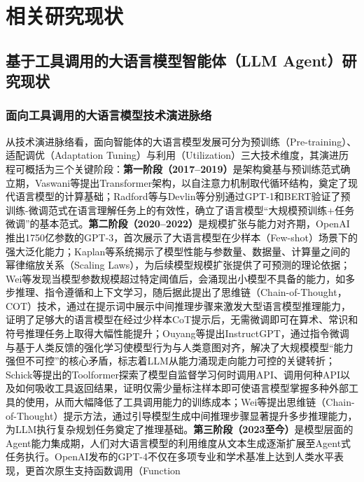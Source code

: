 \section{相关研究现状}

\subsection{基于工具调用的大语言模型智能体（LLM Agent）研究现状}

\subsubsection{面向工具调用的大语言模型技术演进脉络}

从技术演进脉络看，面向智能体的大语言模型发展可分为预训练（Pre-training）、适配调优（Adaptation Tuning）与利用（Utilization）三大技术维度\cite{zhao2023survey}，其演进历程可概括为三个关键阶段：\textbf{第一阶段（2017--2019）}是架构奠基与预训练范式确立期，Vaswani等\cite{vaswani2017attention}提出Transformer架构，以自注意力机制取代循环结构，奠定了现代语言模型的计算基础；Radford等\cite{radford2018improving}与Devlin等\cite{devlin2019bert}分别通过GPT-1和BERT验证了预训练-微调范式在语言理解任务上的有效性，确立了语言模型“大规模预训练+任务微调”的基本范式。\textbf{第二阶段（2020--2022）}是规模扩张与能力对齐期，OpenAI\cite{brown2020language}推出1750亿参数的GPT-3，首次展示了大语言模型在少样本（Few-shot）场景下的强大泛化能力；Kaplan等\cite{kaplan2020scaling}系统揭示了模型性能与参数量、数据量、计算量之间的幂律缩放关系（Scaling Laws），为后续模型规模扩张提供了可预测的理论依据；Wei等\cite{wei2022emergent}发现当模型参数规模超过特定阈值后，会涌现出小模型不具备的能力，如多步推理、指令遵循和上下文学习，随后据此提出了思维链（Chain-of-Thought，COT）\cite{wei2022chain}技术，通过在提示词中展示中间推理步骤来激发大型语言模型推理能力，证明了足够大的语言模型在经过少样本CoT提示后，无需微调即可在算术、常识和符号推理任务上取得大幅性能提升；Ouyang等\cite{ouyang2022training}提出InstructGPT，通过指令微调与基于人类反馈的强化学习使模型行为与人类意图对齐，解决了大规模模型“能力强但不可控”的核心矛盾，标志着LLM从能力涌现走向能力可控的关键转折；Schick等\cite{schick2023toolformer}提出的Toolformer探索了模型自监督学习何时调用API、调用何种API以及如何吸收工具返回结果，证明仅需少量标注样本即可使语言模型掌握多种外部工具的使用，从而大幅降低了工具调用能力的训练成本；Wei等\cite{wei2022chain}提出思维链（Chain-of-Thought）提示方法，通过引导模型生成中间推理步骤显著提升多步推理能力，为LLM执行复杂规划任务奠定了推理基础。\textbf{第三阶段（2023至今）}是模型层面的Agent能力集成期，人们对大语言模型的利用维度从文本生成逐渐扩展至Agent式任务执行。OpenAI发布的GPT-4\cite{openai2023gpt4}不仅在多项专业和学术基准上达到人类水平表现，更首次原生支持函数调用（Function 